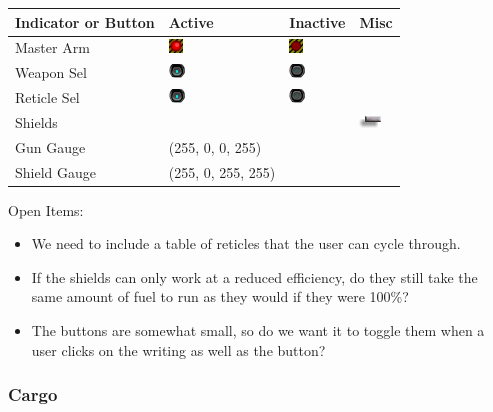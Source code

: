 \begin{tabular}{ | l | l | l | l | }
\hline
Indicator or Button & Active & Inactive & Misc\\
\hline
Master Arm & \includegraphics{images/button_danger_on.png} & \includegraphics{images/button_danger_off.png} & \\
Weapon Sel & \includegraphics{images/button_on.png} & \includegraphics{images/button_off.png} & \\
Reticle Sel & \includegraphics{images/button_on.png} & \includegraphics{images/button_off.png} & \\
Shields & & & \includegraphics{images/slider.png} \\
Gun Gauge & (255, 0, 0, 255) & & \\
Shield Gauge & (255, 0, 255, 255) & & \\
\hline
\end{tabular}

Open Items:
\begin{itemize}
\item We need to include a table of reticles that the user can cycle through.
\item If the shields can only work at a reduced efficiency, do they still
take the same amount of fuel to run as they would if they were 100\%?
\item The buttons are somewhat small, so do we want it to toggle them
when a user clicks on the writing as well as the button?
\end{itemize}

\subsubsection{Cargo}

